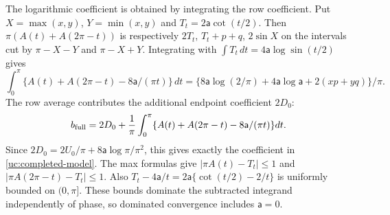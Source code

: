 The logarithmic coefficient is obtained by integrating the row coefficient.
Put $X=\max(x,y)$, $Y=\min(x,y)$ and $T_t=2\mathsf{a}\cot(t/2)$. Then
$\pi(A(t)+A(2\pi-t))$ is respectively
$2T_t$, $T_t+p+q$, $2\sin X$ on the intervals cut by
$\pi-X-Y$ and $\pi-X+Y$. Integrating with
$\int T_t\,dt=4\mathsf{a}\log\sin(t/2)$ gives
\[
 \int_0^\pi\{A(t)+A(2\pi-t)-8\mathsf{a}/(\pi t)\}\,dt
 =\{8\mathsf{a}\log(2/\pi)+4\mathsf{a}\log \mathsf{a}+2(xp+yq)\}/\pi.
\]
The row average contributes the additional endpoint coefficient $2D_0$:
\[
 b_{\rm full}=2D_0+\frac1\pi\int_0^\pi
       \{A(t)+A(2\pi-t)-8\mathsf a/(\pi t)\}dt.
\]
Since $2D_0=2U_0/\pi+8\mathsf a\log\pi/\pi^2$, this gives exactly
the coefficient in \eqref{uc:completed-model}.
The max formulas give
$|\pi A(t)-T_t|\leq1$ and $|\pi A(2\pi-t)-T_t|\leq1$.
Also $T_t-4\mathsf a/t=2\mathsf a\{\cot(t/2)-2/t\}$ is uniformly
bounded on $(0,\pi]$. These bounds dominate the subtracted integrand
independently of phase, so dominated convergence includes $\mathsf{a}=0$.

